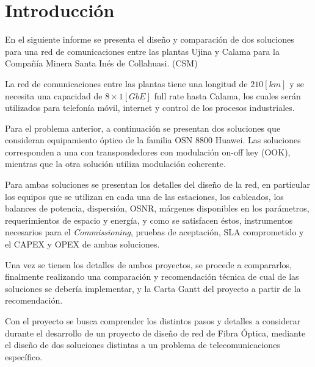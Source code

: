 \documentclass[letterpaper,11pt]{article} %
\begin{document}
	






\section{Introducción}

\newp
En el siguiente informe se presenta el diseño y comparación de dos soluciones para una red de comunicaciones entre las plantas Ujina y Calama para la Compañía Minera Santa Inés de Collahuasi. (CSM)

\newp
La red de comunicaciones entre las plantas tiene una longitud de $210[km]$ y se necesita una capacidad de $8\times1[GbE]$ full rate hasta Calama, los cuales serán utilizados para telefonía móvil, internet y control de los procesos industriales.

\newp
Para el problema anterior, a continuación se presentan dos soluciones que consideran equipamiento óptico de la familia OSN 8800 Huawei. Las soluciones corresponden a una con transpondedores con modulación on-off key (OOK), mientras que la otra solución utiliza modulación coherente.

\newp
Para ambas soluciones se presentan los detalles del diseño de la red, en particular los equipos que se utilizan en cada una de las estaciones, los cableados, los balances de potencia, dispersión, OSNR, márgenes disponibles en los parámetros, requerimientos de espacio y energía, y como se satisfacen éstos, instrumentos necesarios para el \textit{Commissioning}, pruebas de aceptación, SLA comprometido y el CAPEX y OPEX de ambas soluciones.

\newp
Una vez se tienen los detalles de ambos proyectos, se procede a compararlos, finalmente realizando una comparación y recomendación técnica de cual de las soluciones se debería implementar, y la Carta Gantt del proyecto a partir de la recomendación.

\newp
Con el proyecto se busca comprender los distintos pasos y detalles a considerar durante el desarrollo de un proyecto de diseño de red de Fibra Óptica, mediante el diseño de dos soluciones distintas a un problema de telecomunicaciones específico.
\end{document}
